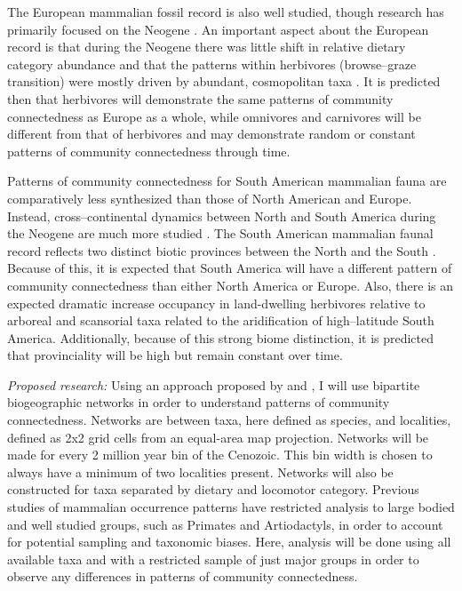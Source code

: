 \documentclass[12pt,letterpaper]{article}
\begin{document}
The European mammalian fossil record is also well studied, though research has primarily focused on the Neogene \citep{Jernvall2002,Jernvall2004,Liow2008,Raia2006,Raia2005,Raia2011c}. An important aspect about the European record is that during the Neogene there was little shift in relative dietary category abundance \citep{Jernvall2004} and that the patterns within herbivores (browse--graze transition) were mostly driven by abundant, cosmopolitan taxa \citep{Jernvall2002}. It is predicted then that herbivores will demonstrate the same patterns of community connectedness as Europe as a whole, while omnivores and carnivores will be different from that of herbivores and may demonstrate random or constant patterns of community connectedness through time. 

Patterns of community connectedness for South American mammalian fauna are comparatively less synthesized than those of North American and Europe. Instead, cross--continental dynamics between North and South America during the Neogene are much more studied \citep{Marshall1982}. The South American mammalian faunal record reflects two distinct biotic provinces between the North and the South \citep{Macfadden1997,Macfadden2006,Flynn1998a,Patterson1968}. Because of this, it is expected that South America will have a different pattern of community connectedness than either North America or Europe. Also, there is an expected dramatic increase occupancy in land-dwelling herbivores relative to arboreal and scansorial taxa related to the aridification of high--latitude South America. Additionally, because of this strong biome distinction, it is predicted that provinciality will be high but remain constant over time. %


\textit{Proposed research:}
Using an approach proposed by \citet{Sidor2013} and \citet{Vilhena2013}, I will use bipartite biogeographic networks in order to understand patterns of community connectedness. Networks are between taxa, here defined as species, and localities, defined as 2x2 grid cells from an equal-area map projection. Networks will be made for every 2 million year bin of the Cenozoic. This bin width is chosen to always have a minimum of two localities present. Networks will also be constructed for taxa separated by dietary and locomotor category. Previous studies of mammalian occurrence patterns have restricted analysis to large bodied and well studied groups, such as Primates and Artiodactyls, in order to account for potential sampling and taxonomic biases. Here, analysis will be done using all available taxa and with a restricted sample of just major groups in order to observe any differences in patterns of community connectedness. 
\end{document}
